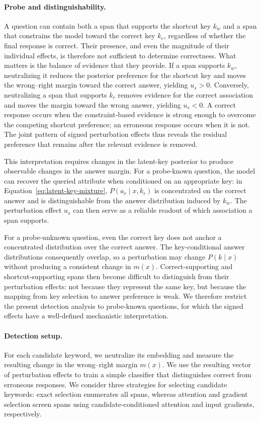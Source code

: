\paragraph{Probe and distinguishability.}
A question can contain both a span that supports the shortcut key $k_w$ and a
span that constrains the model toward the correct key $k_r$, regardless of
whether the final response is correct. Their presence, and even the magnitude
of their individual effects, is therefore not sufficient to determine
correctness. What matters is the balance of evidence that they provide. If a
span supports $k_w$, neutralizing it reduces the posterior preference for the
shortcut key and moves the wrong--right margin toward the correct answer,
yielding $u_s>0$. Conversely, neutralizing a span that supports $k_r$ removes
evidence for the correct association and moves the margin toward the wrong
answer, yielding $u_s<0$. A correct response occurs when the constraint-based
evidence is strong enough to overcome the competing shortcut preference; an
erroneous response occurs when it is not. The joint pattern of signed
perturbation effects thus reveals the residual preference that remains after
the relevant evidence is removed.

This interpretation requires changes in the latent-key posterior to produce
observable changes in the answer margin. For a probe-known question, the model
can recover the queried attribute when conditioned on an appropriate key: in
Equation~\ref{eq:latent-key-mixture}, $P(a_r\mid x,k_r)$ is concentrated on the
correct answer and is distinguishable from the answer distribution induced by
$k_w$. The perturbation effect $u_s$ can then serve as a reliable readout of
which association a span supports.

For a probe-unknown question, even the correct key does not anchor a
concentrated distribution over the correct answer. The key-conditional answer
distributions consequently overlap, so a perturbation may change $P(k\mid x)$
without producing a consistent change in $m(x)$. Correct-supporting and
shortcut-supporting spans then become difficult to distinguish from their
perturbation effects: not because they represent the same key, but because the
mapping from key selection to answer preference is weak. We therefore restrict
the present detection analysis to probe-known questions, for which the signed
effects have a well-defined mechanistic interpretation.

\paragraph{Detection setup.}
For each candidate keyword, we neutralize its embedding and measure the
resulting change in the wrong--right margin $m(x)$. We use the resulting vector
of perturbation effects to train a simple classifier that distinguishes correct
from erroneous responses. We consider three strategies for selecting candidate
keywords: exact selection enumerates all spans, whereas attention and gradient
selection screen spans using candidate-conditioned attention and input
gradients, respectively.

